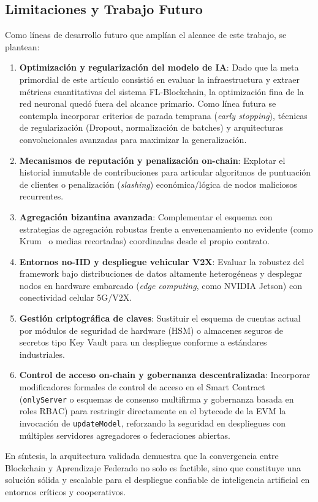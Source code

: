 \subsection{Limitaciones y Trabajo Futuro}
Como líneas de desarrollo futuro que amplían el alcance de este trabajo, se plantean:
\begin{enumerate}
    \item \textbf{Optimización y regularización del modelo de IA}: Dado que la meta primordial de este artículo consistió en evaluar la infraestructura y extraer métricas cuantitativas del sistema FL-Blockchain, la optimización fina de la red neuronal quedó fuera del alcance primario. Como línea futura se contempla incorporar criterios de parada temprana (\textit{early stopping}), técnicas de regularización (Dropout, normalización de batches) y arquitecturas convolucionales avanzadas para maximizar la generalización.
    \item \textbf{Mecanismos de reputación y penalización on-chain}: Explotar el historial inmutable de contribuciones para articular algoritmos de puntuación de clientes o penalización (\textit{slashing}) económica/lógica de nodos maliciosos recurrentes.
    \item \textbf{Agregación bizantina avanzada}: Complementar el esquema con estrategias de agregación robustas frente a envenenamiento no evidente (como Krum~\cite{blanchard2017byzantine} o medias recortadas) coordinadas desde el propio contrato.
    \item \textbf{Entornos no-IID y despliegue vehicular V2X}: Evaluar la robustez del framework bajo distribuciones de datos altamente heterogéneas y desplegar nodos en hardware embarcado (\textit{edge computing}, como NVIDIA Jetson) con conectividad celular 5G/V2X.
    \item \textbf{Gestión criptográfica de claves}: Sustituir el esquema de cuentas actual por módulos de seguridad de hardware (HSM) o almacenes seguros de secretos tipo Key Vault para un despliegue conforme a estándares industriales.
    \item \textbf{Control de acceso on-chain y gobernanza descentralizada}: Incorporar modificadores formales de control de acceso en el Smart Contract (\texttt{onlyServer} o esquemas de consenso multifirma y gobernanza basada en roles RBAC) para restringir directamente en el bytecode de la EVM la invocación de \texttt{updateModel}, reforzando la seguridad en despliegues con múltiples servidores agregadores o federaciones abiertas.
\end{enumerate}
En síntesis, la arquitectura validada demuestra que la convergencia entre Blockchain y Aprendizaje Federado no solo es factible, sino que constituye una solución sólida y escalable para el despliegue confiable de inteligencia artificial en entornos críticos y cooperativos.

